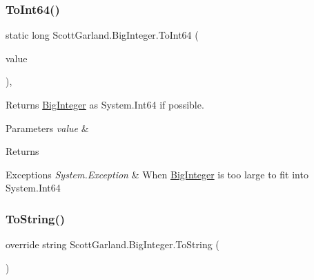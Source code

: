 \subsubsection{\texorpdfstring{To\+Int64()}{ToInt64()}}
{\footnotesize\ttfamily static long Scott\+Garland.\+Big\+Integer.\+To\+Int64 (\begin{DoxyParamCaption}\item[{\hyperlink{class_scott_garland_1_1_big_integer}{Big\+Integer}}]{value }\end{DoxyParamCaption})\hspace{0.3cm}{\ttfamily [inline]}, {\ttfamily [static]}}



Returns \hyperlink{class_scott_garland_1_1_big_integer}{Big\+Integer} as System.\+Int64 if possible. 


\begin{DoxyParams}{Parameters}
{\em value} & \\
\hline
\end{DoxyParams}
\begin{DoxyReturn}{Returns}

\end{DoxyReturn}

\begin{DoxyExceptions}{Exceptions}
{\em System.\+Exception} & When \hyperlink{class_scott_garland_1_1_big_integer}{Big\+Integer} is too large to fit into System.\+Int64\\
\hline
\end{DoxyExceptions}
\mbox{\label{class_scott_garland_1_1_big_integer_ac650e505ca8c6b7c86731ff4c158f006}} 
\subsubsection{\texorpdfstring{To\+String()}{ToString()}\hspace{0.1cm}{\footnotesize\ttfamily [1/2]}}
{\footnotesize\ttfamily override string Scott\+Garland.\+Big\+Integer.\+To\+String (\begin{DoxyParamCaption}{ }\end{DoxyParamCaption})\hspace{0.3cm}{\ttfamily [inline]}}




